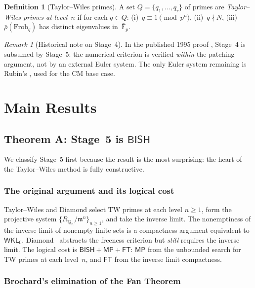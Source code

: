 \documentclass[11pt]{article}
\theoremstyle{plain}
\theoremstyle{definition}
\newtheorem{definition}[theorem]{Definition}
\theoremstyle{remark}
\newtheorem{remark}[theorem]{Remark}
\newcommand{\F}{\mathbb{F}}
\newcommand{\fm}{\mathfrak{m}}
\newcommand{\Frob}{\mathrm{Frob}}
\newcommand{\BISH}{\mathsf{BISH}}
\newcommand{\MP}{\mathsf{MP}}
\newcommand{\FT}{\mathsf{FT}}
\newcommand{\WKL}{\mathsf{WKL}_0}
\begin{document}
\begin{definition}[Taylor--Wiles primes]\label{def:tw}
A set $Q = \{q_1, \ldots, q_r\}$ of primes are \emph{Taylor--Wiles
primes at level~$n$} if for each $q \in Q$:
(i)~$q \equiv 1 \pmod{p^n}$,
(ii)~$q \nmid N$,
(iii)~$\bar{\rho}(\Frob_q)$ has distinct eigenvalues
in~$\bar{\F}_p$.
\end{definition}

\begin{remark}[Historical note on Stage~4]\label{rem:stage4}
In the published 1995 proof \cite{Wiles1995}, Stage~4 is subsumed
by Stage~5: the numerical criterion is verified \emph{within} the
patching argument, not by an external Euler system.  The only Euler
system remaining is Rubin's \cite{Rubin1991}, used for the CM base
case.
\end{remark}


\section{Main Results}\label{sec:main}

\subsection{Theorem A: Stage~5 is \texorpdfstring{$\BISH$}{BISH}}\label{sec:stage5}

We classify Stage~5 first because the result is the most
surprising: the heart of the Taylor--Wiles method is fully
constructive.

\subsubsection{The original argument and its logical cost}

Taylor--Wiles \cite{TaylorWiles1995} and Diamond \cite{Diamond1997}
select TW primes at each level $n \ge 1$, form the projective
system $\{R_{Q_n} / \fm^n\}_{n \ge 1}$, and take the inverse limit.
The nonemptiness of the inverse limit of nonempty finite sets is a
compactness argument equivalent to $\WKL$.
Diamond~\cite{Diamond1997} abstracts the freeness criterion but
\emph{still} requires the inverse limit.
The logical cost is $\BISH + \MP + \FT$:
$\MP$ from the unbounded search for TW primes at each level~$n$,
and $\FT$ from the inverse limit compactness.

\subsubsection{Brochard's elimination of the Fan Theorem}
\end{document}
